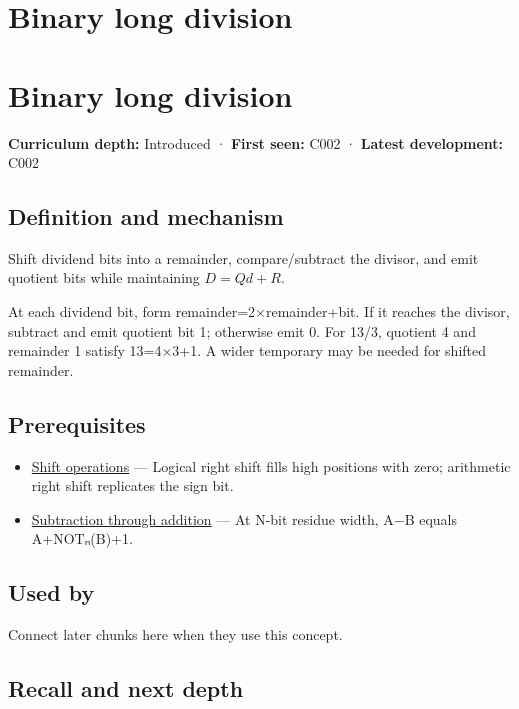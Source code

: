 \hypertarget{appendix-89985e6a2685}{}
\section*{Binary long division}
\section{Binary long division}\label{appendix-89985e6a2685-binary-long-division}

\textbf{Curriculum depth:} Introduced · \textbf{First seen:} C002 · \textbf{Latest development:} C002

\subsection{Definition and mechanism}\label{appendix-89985e6a2685-definition-and-mechanism}

Shift dividend bits into a remainder, compare/subtract the divisor, and emit quotient bits while maintaining \(D=Qd+R\).

At each dividend bit, form remainder=2×remainder+bit. If it reaches the divisor, subtract and emit quotient bit 1; otherwise emit 0. For 13/3, quotient 4 and remainder 1 satisfy 13=4×3+1. A wider temporary may be needed for shifted remainder.

\subsection{Prerequisites}\label{appendix-89985e6a2685-prerequisites}

\begin{itemize}
\tightlist
\item
  \hyperref[appendix-73425b25118e]{Shift operations} --- Logical right shift fills high positions with zero; arithmetic right shift replicates the sign bit.
\item
  \hyperref[appendix-1c7df340573e]{Subtraction through addition} --- At N-bit residue width, A−B equals A+NOTₙ(B)+1.
\end{itemize}

\subsection{Used by}\label{appendix-89985e6a2685-used-by}

Connect later chunks here when they use this concept.

\subsection{Recall and next depth}\label{appendix-89985e6a2685-recall-and-next-depth}

